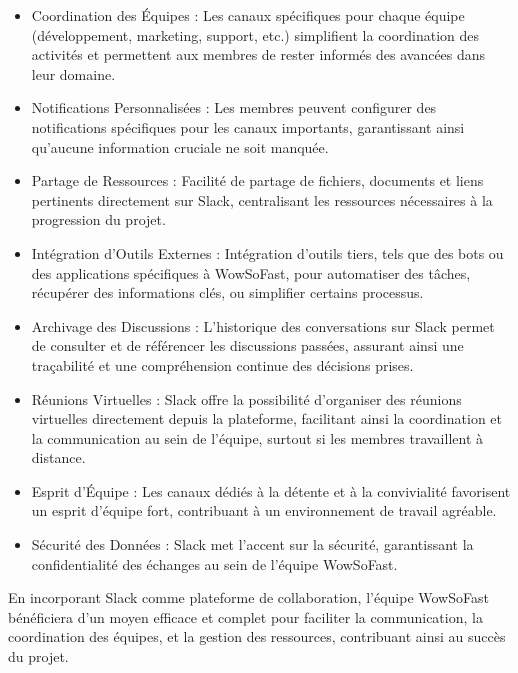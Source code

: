{\begin{itemize}
  \item Coordination des Équipes : Les canaux spécifiques pour chaque équipe (développement, marketing, support, etc.) simplifient la coordination des activités et permettent aux membres de rester informés des avancées dans leur domaine.

  \item Notifications Personnalisées : Les membres peuvent configurer des notifications spécifiques pour les canaux importants, garantissant ainsi qu'aucune information cruciale ne soit manquée.

  \item Partage de Ressources : Facilité de partage de fichiers, documents et liens pertinents directement sur Slack, centralisant les ressources nécessaires à la progression du projet.

  \item Intégration d'Outils Externes : Intégration d'outils tiers, tels que des bots ou des applications spécifiques à WowSoFast, pour automatiser des tâches, récupérer des informations clés, ou simplifier certains processus.

  \item Archivage des Discussions : L'historique des conversations sur Slack permet de consulter et de référencer les discussions passées, assurant ainsi une traçabilité et une compréhension continue des décisions prises.

  \item Réunions Virtuelles : Slack offre la possibilité d'organiser des réunions virtuelles directement depuis la plateforme, facilitant ainsi la coordination et la communication au sein de l'équipe, surtout si les membres travaillent à distance.

  \item Esprit d'Équipe : Les canaux dédiés à la détente et à la convivialité favorisent un esprit d'équipe fort, contribuant à un environnement de travail agréable.

  \item Sécurité des Données : Slack met l'accent sur la sécurité, garantissant la confidentialité des échanges au sein de l'équipe WowSoFast.
\end{itemize}

En incorporant Slack comme plateforme de collaboration, l'équipe WowSoFast bénéficiera d'un moyen efficace et complet pour faciliter la communication, la coordination des équipes, et la gestion des ressources, contribuant ainsi au succès du projet.
\vspace{1cm}

}
